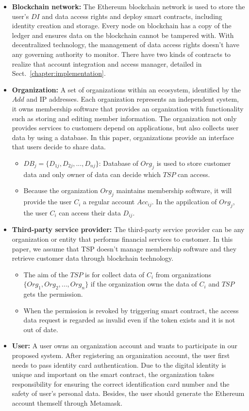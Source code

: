     \begin{itemize}
        \item \textbf{Blockchain network:} The Ethereum blockchain network is used to store the user's \(DI\) and data access rights and deploy smart contracts, including identity creation and storage. Every node on blockchain has a copy of the ledger and ensures data on the blockchain cannot be tampered with. With decentralized technology, the management of data access rights doesn't have any governing authority to monitor. There have two kinds of contracts to realize that account integration and access manager, detailed in Sect.~\ref{chapter:implementation}.  
        \item \textbf{Organization:} A set of organizations within an ecosystem, identified by the \(Add\) and IP addresses. Each organization represents an independent system, it owns membership software that provides an organization with functionality such as storing and editing member information. The organization not only provides services to customers depend on applications, but also collects user data by using a database. In this paper, organizations provide an interface that users decide to share data.
        \begin{itemize}[noitemsep]
            \item $DB_j = \{D_{1j}, D_{2j}, ..., D_{nj}\}$: Database of $Org_j$ is used to store customer data and only owner of data can decide which $TSP$ can access. 
            \item Because the organization $Org_j$ maintains membership software, it will provide the user $C_i$ a regular account $Acc_{ij}$. In the appilcation of $Org_j$, the user $C_i$ can access their data $D_{ij}$.
        \end{itemize}
        \item \textbf{Third-party service provider:} The third-party service provider can be any organization or entity that performs financial services to customer. In this paper, we assume that TSP doesn't manage membership software and they retrieve customer data through blockchain technology.
        \begin{itemize}[noitemsep]
            \item The aim of the $TSP$ is for collect data of $C_i$ from organizations $\{Org_1, Org_2, ..., Org_n\}$ if the organization owns the data of $C_i$ and $TSP$ gets the permission.
            \item When the permission is revoked by triggering smart contract, the access data request is regarded as invalid even if the token exists and it is not out of date.
        \end{itemize}
        \item \textbf{User:} A user owns an organization account and wants to participate in our proposed system. After registering an organization account, the user first needs to pass identity card authentication. Due to the digital identity is unique and important on the smart contract, the organization takes responsibility for ensuring the correct identification card number and the safety of user's personal data. Besides, the user should generate the Ethereum account themself through Metamask.
    \end{itemize}

